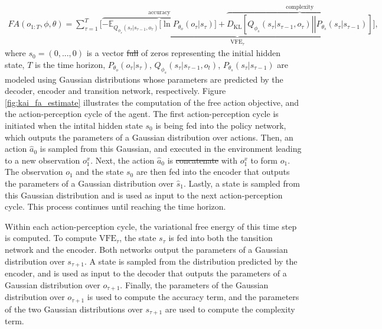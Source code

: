 \documentclass[twoside,11pt]{article}
\newcommand{\kl}[2]{D_{\mathrm{KL}} \left[ \left. \left. #1 \right|\right| #2 \right] }
\providecommand{\DIFadd}[1]{{\protect\color{blue}\uwave{#1}}} %
\providecommand{\DIFdel}[1]{{\protect\color{red}\sout{#1}}}                      %
\providecommand{\DIFaddbegin}{} %
\providecommand{\DIFaddend}{} %
\providecommand{\DIFdelbegin}{} %
\providecommand{\DIFdelend}{} %
\begin{document}
\begin{align*}
FA(o_{1:T}, \phi, \theta) = \sum_{\tau = 1}^T \Bigg[\underbrace{\overbrace{- \mathbb{E}_{Q_{\phi_s}(s_\tau|s_{\tau-1}, o_\tau)}\Big[\ln P_{\theta_o}(o_\tau|s_\tau)\Big]}^{\text{accuracy}} + \overbrace{\kl{Q_{\phi_s}(s_\tau|s_{\tau-1}, o_\tau)}{P_{\theta_s}(s_\tau|s_{\tau-1})}}^{\text{complexity}} }_{\text{VFE}_\tau}\Bigg],
\end{align*}
where $s_0 = (0, ..., 0)$ is a vector \DIFdelbegin \DIFdel{full }\DIFdelend of zeros representing the initial hidden state, $T$ is the time horizon, $P_{\theta_o}(o_\tau|s_\tau)$, $Q_{\phi_s}(s_\tau|s_{\tau-1}, o_t)$, $P_{\theta_s}(s_\tau|s_{\tau-1})$ are modeled using Gaussian distributions whose parameters are predicted by the decoder, encoder and transition network, respectively. Figure \ref{fig:kai_fa_estimate} illustrates the computation of the free action objective, and the action-perception cycle of the agent. The first action-perception cycle is initiated when the intital hidden state $s_0$ is being fed into the policy network, which outputs the parameters of a Gaussian distribution over actions. Then, an action $\hat{a}_0$ is sampled from this Gaussian, and executed in the environment leading to a new observation $o_1^x$. Next, the action $\hat{a}_0$ is \DIFdelbegin \DIFdel{concatenate }\DIFdelend \DIFaddbegin \DIFadd{concatenated }\DIFaddend with $o_1^x$ to form $o_1$. The observation $o_1$ and the state $s_0$ are then fed into the encoder that outputs the parameters of a Gaussian distribution over $\hat{s}_1$. Lastly, a state is sampled from this Gaussian distribution and is used as input to the next action-perception cycle. This process continues until reaching the time horizon.

Within each action-perception cycle, the variational free energy of this time step is computed. To compute $\text{VFE}_\tau$, the state $s_\tau$  is fed into both the tansition network and the encoder. Both networks output the parameters of a Gaussian distribution over $s_{\tau+1}$. A state is sampled from the distribution predicted by the encoder, and is used as input to the decoder that outputs the parameters of a Gaussian distribution over $o_{\tau + 1}$. Finally, the parameters of the Gaussian distribution over $o_{\tau + 1}$ is used to compute the accuracy term, and the parameters of the two Gaussian distributions over $s_{\tau+1}$ are used to compute the complexity term.
\end{document}

